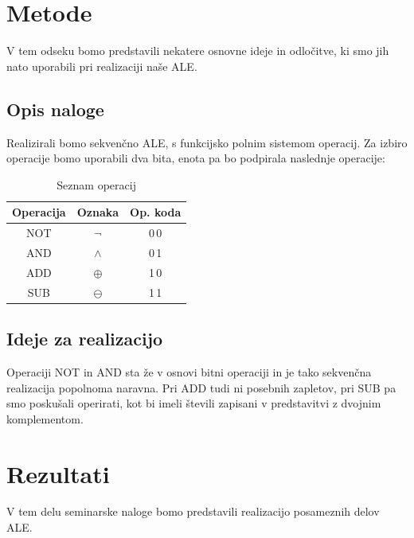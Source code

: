 \documentclass[seminar, slovene]{FRIreport}
\begin{document}
%
\section{Metode}
V tem odseku bomo predstavili nekatere osnovne ideje in odločitve, ki smo jih nato uporabili pri realizaciji naše ALE.

\subsection{Opis naloge}
Realizirali bomo sekvenčno ALE, s funkcijsko polnim sistemom operacij. Za izbiro operacije bomo uporabili dva bita, enota pa bo podpirala naslednje operacije:\\
\begin{table}[h!]
\begin{center}
\begin{tabular}{ | c | c | c | }\hline
\textbf{Operacija} & \textbf{Oznaka} & \textbf{Op. koda} \\ \hline
NOT & $\lnot$ & 0\,0 \\
AND & $\wedge$ & 0\,1 \\
ADD & $\oplus$ & 1\,0 \\
SUB & $\ominus$ & 1\,1 \\ \hline
\end{tabular}
\end{center}
\caption{Seznam operacij}
\label{optable}
\end{table}
\subsection{Ideje za realizacijo}
Operaciji NOT in AND sta že v osnovi bitni operaciji in je tako sekvenčna realizacija popolnoma naravna. Pri ADD tudi ni posebnih zapletov, pri SUB pa smo poskušali operirati, kot bi imeli števili zapisani v predstavitvi z dvojnim komplementom.

%
\section{Rezultati}
V tem delu seminarske naloge bomo predstavili realizacijo posameznih delov ALE.
\end{document}
